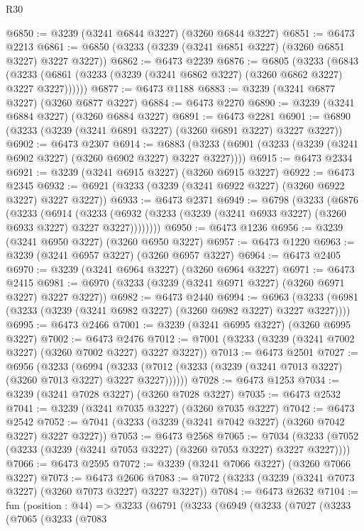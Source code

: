 \begin{lexlean}{R30}
\begin{coremodule}
@6850 := @3239 (@3241 @6844 @3227) (@3260 @6844 @3227)
@6851 := @6473 @2213
@6861 := @6850 (@3233 (@3239 (@3241 @6851 @3227) (@3260 @6851 @3227) @3227 @3227))
@6862 := @6473 @2239
@6876 := @6805
    (@3233
      (@6843 (@3233 (@6861 (@3233 (@3239 (@3241 @6862 @3227) (@3260 @6862 @3227) @3227 @3227))))))
@6877 := @6473 @1188
@6883 := @3239 (@3241 @6877 @3227) (@3260 @6877 @3227)
@6884 := @6473 @2270
@6890 := @3239 (@3241 @6884 @3227) (@3260 @6884 @3227)
@6891 := @6473 @2281
@6901 := @6890 (@3233 (@3239 (@3241 @6891 @3227) (@3260 @6891 @3227) @3227 @3227))
@6902 := @6473 @2307
@6914 := @6883 (@3233 (@6901 (@3233 (@3239 (@3241 @6902 @3227) (@3260 @6902 @3227) @3227 @3227))))
@6915 := @6473 @2334
@6921 := @3239 (@3241 @6915 @3227) (@3260 @6915 @3227)
@6922 := @6473 @2345
@6932 := @6921 (@3233 (@3239 (@3241 @6922 @3227) (@3260 @6922 @3227) @3227 @3227))
@6933 := @6473 @2371
@6949 := @6798
    (@3233
      (@6876
        (@3233
          (@6914
            (@3233 (@6932 (@3233 (@3239 (@3241 @6933 @3227) (@3260 @6933 @3227) @3227 @3227))))))))
@6950 := @6473 @1236
@6956 := @3239 (@3241 @6950 @3227) (@3260 @6950 @3227)
@6957 := @6473 @1220
@6963 := @3239 (@3241 @6957 @3227) (@3260 @6957 @3227)
@6964 := @6473 @2405
@6970 := @3239 (@3241 @6964 @3227) (@3260 @6964 @3227)
@6971 := @6473 @2415
@6981 := @6970 (@3233 (@3239 (@3241 @6971 @3227) (@3260 @6971 @3227) @3227 @3227))
@6982 := @6473 @2440
@6994 := @6963 (@3233 (@6981 (@3233 (@3239 (@3241 @6982 @3227) (@3260 @6982 @3227) @3227 @3227))))
@6995 := @6473 @2466
@7001 := @3239 (@3241 @6995 @3227) (@3260 @6995 @3227)
@7002 := @6473 @2476
@7012 := @7001 (@3233 (@3239 (@3241 @7002 @3227) (@3260 @7002 @3227) @3227 @3227))
@7013 := @6473 @2501
@7027 := @6956
    (@3233
      (@6994 (@3233 (@7012 (@3233 (@3239 (@3241 @7013 @3227) (@3260 @7013 @3227) @3227 @3227))))))
@7028 := @6473 @1253
@7034 := @3239 (@3241 @7028 @3227) (@3260 @7028 @3227)
@7035 := @6473 @2532
@7041 := @3239 (@3241 @7035 @3227) (@3260 @7035 @3227)
@7042 := @6473 @2542
@7052 := @7041 (@3233 (@3239 (@3241 @7042 @3227) (@3260 @7042 @3227) @3227 @3227))
@7053 := @6473 @2568
@7065 := @7034 (@3233 (@7052 (@3233 (@3239 (@3241 @7053 @3227) (@3260 @7053 @3227) @3227 @3227))))
@7066 := @6473 @2595
@7072 := @3239 (@3241 @7066 @3227) (@3260 @7066 @3227)
@7073 := @6473 @2606
@7083 := @7072 (@3233 (@3239 (@3241 @7073 @3227) (@3260 @7073 @3227) @3227 @3227))
@7084 := @6473 @2632
@7104 := fun (position : @44) =>
  @3233
    (@6791
      (@3233
        (@6949
          (@3233
            (@7027
              (@3233
                (@7065
                  (@3233
                    (@7083

\end{coremodule}
\end{lexlean}
